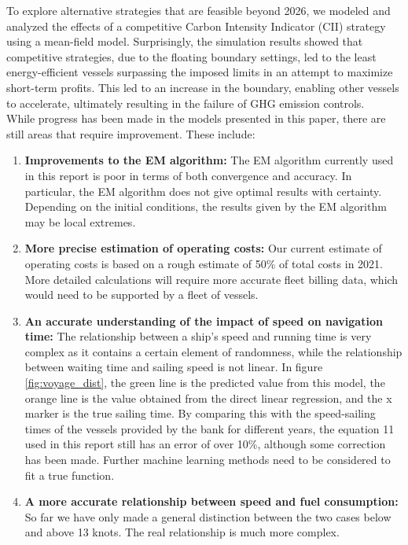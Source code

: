 \documentclass[a4paper,12pt]{article}
\begin{document}
To explore alternative strategies that are feasible beyond 2026, we modeled and analyzed the effects of a competitive Carbon Intensity Indicator (CII) strategy using a mean-field model.
Surprisingly, the simulation results showed that competitive strategies, due to the floating boundary settings, led to the least energy-efficient vessels surpassing the imposed limits in an attempt to maximize short-term profits.
This led to an increase in the boundary, enabling other vessels to accelerate, ultimately resulting in the failure of GHG emission controls.\\

While progress has been made in the models presented in this paper, there are still areas that require improvement. These include:
\begin{enumerate}
	\item \textbf{Improvements to the EM algorithm:} The EM algorithm currently used in this report is poor in terms of both convergence and accuracy. In particular, the EM algorithm does not give optimal results with certainty. 
	Depending on the initial conditions, the results given by the EM algorithm may be local extremes.
	\item \textbf{More precise estimation of operating costs:} Our current estimate of operating costs is based on a rough estimate of 50\% of total costs in 2021. More detailed calculations will require more accurate fleet billing data, which would need to be supported by a fleet of vessels.
	\item  \textbf{An accurate understanding of the impact of speed on navigation time:} The relationship between a ship's speed and running time is very complex as it contains a certain element of randomness, while the relationship between waiting time and sailing speed is not linear. 
	In figure \ref{fig:voyage_dist}, the green line is the predicted value from this model, the orange line is the value obtained from the direct linear regression, and the x marker is the true sailing time.
	By comparing this with the speed-sailing times of the vessels provided by the bank for different years, the equation 11 used in this report still has an error of over 10\%, although some correction has been made. Further machine learning methods need to be considered to fit a true function.
	\item \textbf{A more accurate relationship between speed and fuel consumption:} So far we have only made a general distinction between the two cases below and above 13 knots. The real relationship is much more complex.
\end{enumerate}
\end{document}
